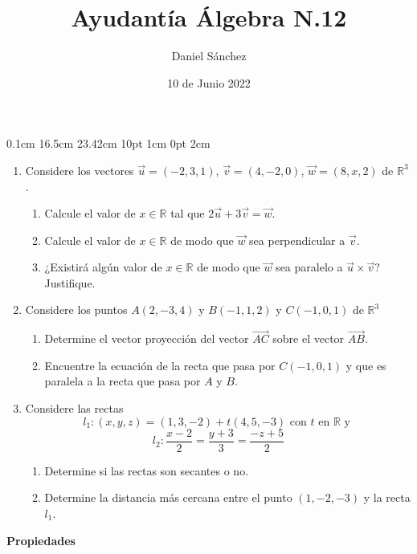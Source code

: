\documentclass[12pt]{article}
\newcommand{\D}{\displaystyle}
\begin{document}
\setmargins{2.5cm}
{0.1cm}
{16.5cm}
{23.42cm}
{10pt}
{1cm}
{0pt}
{2cm}

\title{Ayudant\'ia \'Algebra N.12}
\date{10 de Junio 2022}
\author{Daniel S\'anchez}
\maketitle

\begin{enumerate}
      \item Considere los vectores $\vec{u} = (-2,3,1)$, $\vec{v} = (4,-2,0)$, $\vec{w} = (8,x,2)$ de $\mathbb{R}^3$.
            \begin{enumerate}
                  \item Calcule el valor de $x \in \mathbb{R}$ tal que $2\vec{u} + 3\vec{v} = \vec{w}$.
                  \item Calcule el valor de $x \in \mathbb{R}$ de modo que $\vec{w}$ sea perpendicular a $\vec{v}$.
                  \item ¿Existir\'a alg\'un valor de $x \in \mathbb{R}$ de modo que $\vec{w}$ sea paralelo a $\vec{u} \times \vec{v}$? Justifique.
            \end{enumerate}
      \item Considere los puntos $A(2,-3,4)$ y $B(-1,1,2)$ y $C(-1,0,1)$ de $\mathbb{R}^3$
            \begin{enumerate}
                  \item Determine el vector proyecci\'on del vector $\overrightarrow{AC}$ sobre el vector $\overrightarrow{AB}$.
                  \item Encuentre la ecuaci\'on de la recta que pasa por $C(-1,0,1)$ y que es paralela a la recta que pasa por $A$ y $B$.
            \end{enumerate}
      \item Considere las rectas
            $$l_1 : (x,y,z) = (1,3,-2) + t(4,5,-3) \mbox{ con $t$ en $\mathbb{R}$ y }$$
            $$\D l_2 : \frac{x-2}{2} = \frac{y+3}{3} = \frac{-z+5}{2}$$
            \begin{enumerate}
                  \item Determine si las rectas son secantes o no.
                  \item Determine la distancia m\'as cercana entre el punto $(1,-2,-3)$ y la recta $l_1$.
            \end{enumerate}
\end{enumerate}
\pagebreak
\textbf{Propiedades}
\end{document}
